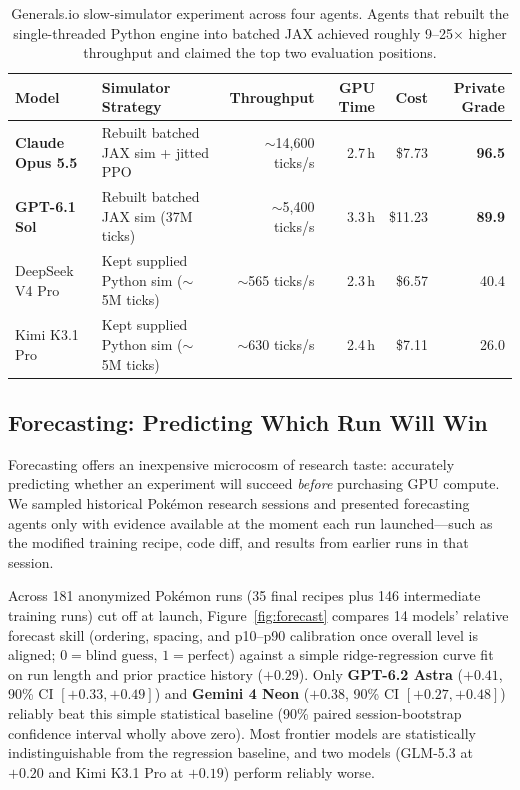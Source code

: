 \documentclass[11pt,letterpaper]{article}
\newcommand{\pokemon}{Pok\'emon}
\begin{document}
\begin{table}[htbp]
\centering
\caption{Generals.io slow-simulator experiment across four agents. Agents that rebuilt the single-threaded Python engine into batched JAX achieved roughly 9--25$\times$ higher throughput and claimed the top two evaluation positions.}
\label{tab:slowsim}
\footnotesize
\begin{tabular}{@{}l l r r r r@{}}
\toprule
\textbf{Model} & \textbf{Simulator Strategy} & \textbf{Throughput} & \textbf{GPU Time} & \textbf{Cost} & \textbf{Private Grade} \\
\midrule
\textbf{Claude Opus 5.5} & Rebuilt batched JAX sim + jitted PPO & $\sim$14,600 ticks/s & 2.7\,h & \$7.73 & \textbf{96.5} \\
\textbf{GPT-6.1 Sol}     & Rebuilt batched JAX sim (37M ticks)  & $\sim$5,400 ticks/s  & 3.3\,h & \$11.23 & \textbf{89.9} \\
DeepSeek V4 Pro          & Kept supplied Python sim ($\sim$5M ticks) & $\sim$565 ticks/s    & 2.3\,h & \$6.57 & 40.4 \\
Kimi K3.1 Pro            & Kept supplied Python sim ($\sim$5M ticks) & $\sim$630 ticks/s    & 2.4\,h & \$7.11 & 26.0 \\
\bottomrule
\end{tabular}
\end{table}

\subsection{Forecasting: Predicting Which Run Will Win}
\label{sec:forecast}

Forecasting offers an inexpensive microcosm of research taste: accurately predicting whether an experiment will succeed \textit{before} purchasing GPU compute. We sampled historical \pokemon{} research sessions and presented forecasting agents only with evidence available at the moment each run launched---such as the modified training recipe, code diff, and results from earlier runs in that session.

Across 181 anonymized \pokemon{} runs (35 final recipes plus 146 intermediate training runs) cut off at launch, Figure~\ref{fig:forecast} compares 14 models' relative forecast skill (ordering, spacing, and p10--p90 calibration once overall level is aligned; $0 = \text{blind guess}$, $1 = \text{perfect}$) against a simple ridge-regression curve fit on run length and prior practice history ($+0.29$). Only \textbf{GPT-6.2 Astra} ($+0.41$, 90\% CI $[+0.33, +0.49]$) and \textbf{Gemini 4 Neon} ($+0.38$, 90\% CI $[+0.27, +0.48]$) reliably beat this simple statistical baseline (90\% paired session-bootstrap confidence interval wholly above zero). Most frontier models are statistically indistinguishable from the regression baseline, and two models (GLM-5.3 at $+0.20$ and Kimi K3.1 Pro at $+0.19$) perform reliably worse.
\end{document}
